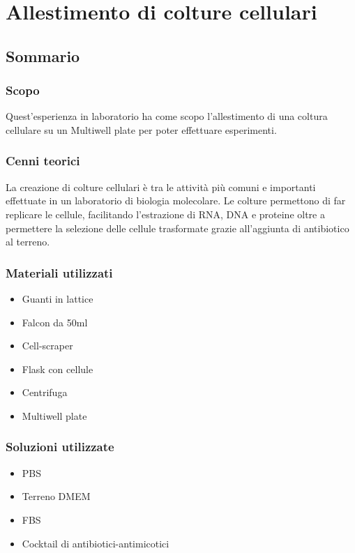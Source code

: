 \chapter{Allestimento di colture cellulari}

\vspace{0.6cm}

\section{Sommario}

\subsection{Scopo}

Quest'esperienza in laboratorio ha come scopo l'allestimento di una coltura cellulare
su un Multiwell plate per poter effettuare esperimenti.

\subsection{Cenni teorici}

La creazione di colture cellulari \`e tra le attivit\`a pi\`u comuni e importanti
effettuate in un laboratorio di biologia molecolare. Le colture permettono di
far replicare le cellule, facilitando l'estrazione di RNA, DNA e proteine oltre a
permettere la selezione delle cellule trasformate grazie all'aggiunta di antibiotico
al terreno.

\subsection{Materiali utilizzati}

\begin{itemize}
	\item Guanti in lattice
	\item Falcon da 50ml
	\item Cell-scraper
	\item Flask con cellule
	\item Centrifuga
	\item Multiwell plate
\end{itemize}

\subsection{Soluzioni utilizzate}

\begin{itemize}
	\item PBS
	\item Terreno DMEM
	\item FBS
	\item Cocktail di antibiotici-antimicotici
\end{itemize}


